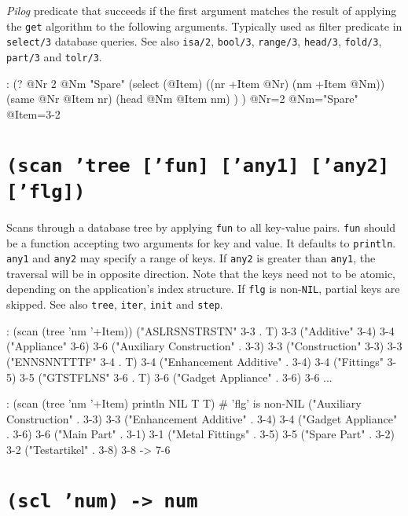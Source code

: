 \emph{Pilog} predicate that succeeds if the first argument
matches the result of applying the \texttt{get} algorithm to the following
arguments. Typically used as filter predicate in \texttt{select/3} database
queries. See also \texttt{isa/2}, \texttt{bool/3}, \texttt{range/3}, \texttt{head/3}, \texttt{fold/3},
\texttt{part/3} and \texttt{tolr/3}.


\begin{wideverbatim}
: (?
   @Nr 2
   @Nm "Spare"
   (select (@Item)
      ((nr +Item @Nr) (nm +Item @Nm))
      (same @Nr @Item nr)
      (head @Nm @Item nm) ) )
 @Nr=2 @Nm="Spare" @Item={3-2}
\end{wideverbatim}

 
\section*{\texttt{(scan 'tree ['fun] ['any1] ['any2] ['flg])}}
\label{sec:func-ref-S-(scan 'tree ['fun] ['any1] ['any2] ['flg])}


Scans through a database tree by applying \texttt{fun} to all key-value pairs.
\texttt{fun} should be a function accepting two arguments for key and value. It
defaults to \texttt{println}. \texttt{any1} and \texttt{any2} may specify a range of keys. If
\texttt{any2} is greater than \texttt{any1}, the traversal will be in opposite
direction. Note that the keys need not to be atomic, depending on the
application's index structure. If \texttt{flg} is non-\texttt{NIL}, partial keys are
skipped. See also \texttt{tree}, \texttt{iter}, \texttt{init} and \texttt{step}.


\begin{wideverbatim}
: (scan (tree 'nm '+Item))
("ASLRSNSTRSTN" {3-3} . T) {3-3}
("Additive" {3-4}) {3-4}
("Appliance" {3-6}) {3-6}
("Auxiliary Construction" . {3-3}) {3-3}
("Construction" {3-3}) {3-3}
("ENNSNNTTTF" {3-4} . T) {3-4}
("Enhancement Additive" . {3-4}) {3-4}
("Fittings" {3-5}) {3-5}
("GTSTFLNS" {3-6} . T) {3-6}
("Gadget Appliance" . {3-6}) {3-6}
...

: (scan (tree 'nm '+Item) println NIL T T)  # 'flg' is non-NIL
("Auxiliary Construction" . {3-3}) {3-3}
("Enhancement Additive" . {3-4}) {3-4}
("Gadget Appliance" . {3-6}) {3-6}
("Main Part" . {3-1}) {3-1}
("Metal Fittings" . {3-5}) {3-5}
("Spare Part" . {3-2}) {3-2}
("Testartikel" . {3-8}) {3-8}
-> {7-6}
\end{wideverbatim}

 
\section*{\texttt{(scl 'num) -> num}}
\label{sec:func-ref-S-(scl 'num) -> num}


